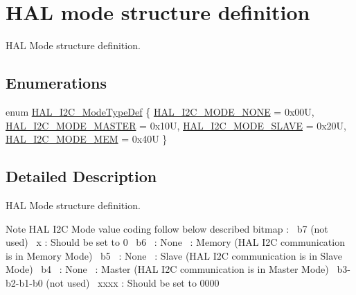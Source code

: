\hypertarget{group___h_a_l__mode__structure__definition}{}\section{H\+AL mode structure definition}
\label{group___h_a_l__mode__structure__definition}


H\+AL Mode structure definition.  


\subsection*{Enumerations}
\begin{DoxyCompactItemize}
\item 
enum \mbox{\hyperlink{group___h_a_l__mode__structure__definition_gabcbb7b844f2ffd63c4e530c117882062}{H\+A\+L\+\_\+\+I2\+C\+\_\+\+Mode\+Type\+Def}} \{ \mbox{\hyperlink{group___h_a_l__mode__structure__definition_ggabcbb7b844f2ffd63c4e530c117882062a98c8fd642b7ac45a23479bd597fc7a71}{H\+A\+L\+\_\+\+I2\+C\+\_\+\+M\+O\+D\+E\+\_\+\+N\+O\+NE}} = 0x00U, 
\mbox{\hyperlink{group___h_a_l__mode__structure__definition_ggabcbb7b844f2ffd63c4e530c117882062a1eea98660a170dd7b191c9dfe46da6d2}{H\+A\+L\+\_\+\+I2\+C\+\_\+\+M\+O\+D\+E\+\_\+\+M\+A\+S\+T\+ER}} = 0x10U, 
\mbox{\hyperlink{group___h_a_l__mode__structure__definition_ggabcbb7b844f2ffd63c4e530c117882062a817358d19d278261f2047a5ec8ec6b53}{H\+A\+L\+\_\+\+I2\+C\+\_\+\+M\+O\+D\+E\+\_\+\+S\+L\+A\+VE}} = 0x20U, 
\mbox{\hyperlink{group___h_a_l__mode__structure__definition_ggabcbb7b844f2ffd63c4e530c117882062a3f592bd942f973242aac6b7df79f3f1e}{H\+A\+L\+\_\+\+I2\+C\+\_\+\+M\+O\+D\+E\+\_\+\+M\+EM}} = 0x40U
 \}
\end{DoxyCompactItemize}


\subsection{Detailed Description}
H\+AL Mode structure definition. 

\begin{DoxyNote}{Note}
H\+AL I2C Mode value coding follow below described bitmap \+:~\newline
 b7 (not used)~\newline
 x \+: Should be set to 0~\newline
 b6~ \+: None~ \+: Memory (H\+AL I2C communication is in Memory Mode)~\newline
 b5~ \+: None~ \+: Slave (H\+AL I2C communication is in Slave Mode)~\newline
 b4~ \+: None~ \+: Master (H\+AL I2C communication is in Master Mode)~\newline
 b3-\/b2-\/b1-\/b0 (not used)~\newline
 xxxx \+: Should be set to 0000 
\end{DoxyNote}


